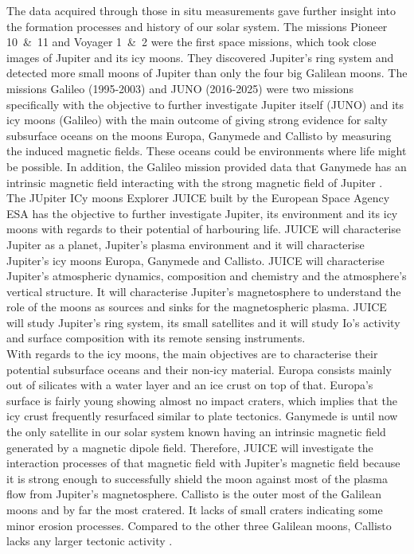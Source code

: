 	The data acquired through those in situ measurements gave further insight into the formation processes and history of our solar system. The missions Pioneer 10~\&~11 and Voyager 1~\&~2 were the first space missions, which took close images of Jupiter and its icy moons. They discovered Jupiter's ring system and detected more small moons of Jupiter than only the four big Galilean moons. The missions Galileo (1995-2003) and JUNO (2016-2025) were two missions specifically with the objective to further investigate Jupiter itself (JUNO) and its icy moons (Galileo) with the main outcome of giving strong evidence for salty subsurface oceans on the moons Europa, Ganymede and Callisto by measuring the induced magnetic fields. These oceans could be environments where life might be possible. In addition, the Galileo mission provided data that Ganymede has an intrinsic magnetic field interacting with the strong magnetic field of Jupiter \cite{Jupiter_SpaceMission}.\\
	The JUpiter ICy moons Explorer JUICE built by the European Space Agency ESA has the objective to further investigate Jupiter, its environment and its icy moons with regards to their potential of harbouring life. JUICE will characterise Jupiter as a planet, Jupiter's plasma environment and it will characterise Jupiter's icy moons Europa, Ganymede and Callisto. JUICE will characterise Jupiter's atmospheric dynamics, composition and chemistry and the atmosphere's vertical structure. It will characterise Jupiter's magnetosphere to understand the role of the moons as sources and sinks for the magnetospheric plasma. JUICE will study Jupiter's ring system, its small satellites and it will study Io's activity and surface composition with its remote sensing instruments.\\
	With regards to the icy moons, the main objectives are to characterise their potential subsurface oceans and their non-icy material. Europa consists mainly out of silicates with a water layer and an ice crust on top of that. Europa's surface is fairly young showing almost no impact craters, which implies that the icy crust frequently resurfaced similar to plate tectonics. Ganymede is until now the only satellite in our solar system known having an intrinsic magnetic field generated by a magnetic dipole field. Therefore, JUICE will investigate the interaction processes of that magnetic field with Jupiter's magnetic field because it is strong enough to successfully shield the moon against most of the plasma flow from Jupiter's magnetosphere. Callisto is the outer most of the Galilean moons and by far the most cratered. It lacks of small craters indicating some minor erosion processes. Compared to the other three Galilean moons, Callisto lacks any larger tectonic activity \cite{red_book}.\\
